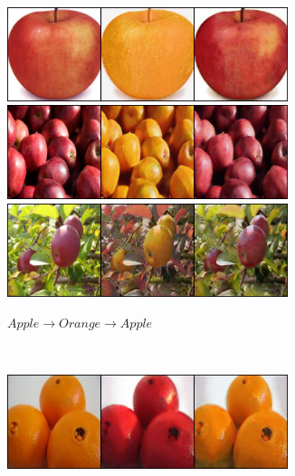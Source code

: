 \documentclass[10pt,twocolumn,letterpaper]{article}
\begin{document}
\begin{figure}[!htb]
     \centering
     \begin{subfigure}[]{0.49\textwidth}
         \centering
         \includegraphics[width=0.9\textwidth]{test_a_2_b_32}\\
         \vspace{0.3cm}
		 \includegraphics[width=0.9\textwidth]{test_a_2_b_65}\\
		 \vspace{0.3cm}
		 \includegraphics[width=0.9\textwidth]{test_a_2_b_111}
		 \caption{$Apple \rightarrow Orange \rightarrow Apple$}
         \label{fig:apple2orange}
     \end{subfigure}
     ~
     \begin{subfigure}[]{0.49\textwidth}
         \centering
         \includegraphics[width=0.9\textwidth]{test_b_2_a_46}\\

\end{subfigure}
\end{figure}
\end{document}
